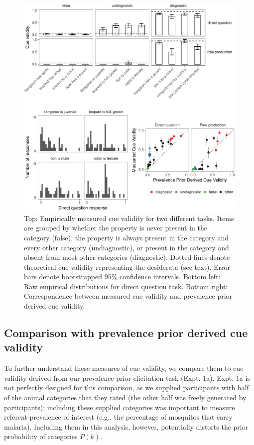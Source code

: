 \documentclass[english,floatsintext,man]{apa6}
\theoremstyle{definition}
\theoremstyle{definition}
\theoremstyle{definition}
\theoremstyle{remark}
\begin{document}
\begin{figure}[htbp]
\centering
\includegraphics{figs/cv-bothquestions-barplots-1.pdf}
\caption{\label{fig:cv-bothquestions-barplots}Top: Empirically measured cue
validity for two different tasks. Items are grouped by whether the
property is never present in the category (false), the property is
always present in the category and every other category (undiagnostic),
or present in the category and absent from most other categories
(diagnostic). Dotted lines denote theoretical cue validity representing
the desiderata (see text). Error bars denote bootstrapped 95\%
confidence intervals. Bottom left: Raw empirical distributions for
direct question task. Bottom right: Correspondence between measured cue
validity and prevalence prior derived cue validity.}
\end{figure}

\subsection{Comparison with prevalence prior derived cue
validity}\label{comparison-with-prevalence-prior-derived-cue-validity}

To further understand these measures of cue validity, we compare them to
cue validity derived from our prevalence prior elicitation task (Expt.
1a). Expt. 1a is not perfectly designed for this comparison, as we
supplied participants with half of the animal categories that they rated
(the other half was freely generated by participants); including these
supplied categories was important to measure referent-prevalence of
interest (e.g., the percentage of mosquitos that carry malaria).
Including them in this analysis, however, potentially distorts the prior
probability of categories \(P(k)\).
\end{document}
